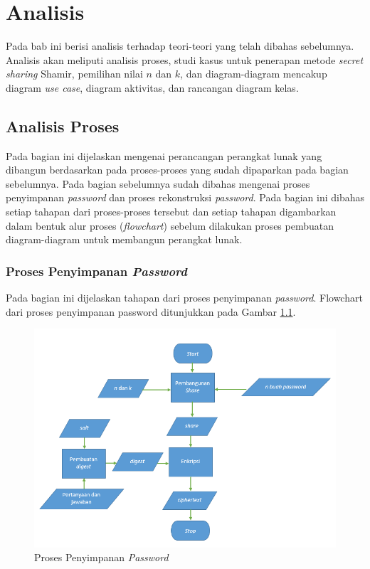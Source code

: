 \chapter{Analisis}
\label{chap:analisis}

Pada bab ini berisi analisis terhadap teori-teori yang telah dibahas sebelumnya. Analisis akan meliputi analisis proses, studi kasus untuk penerapan metode \textit{secret sharing} Shamir, pemilihan nilai \begin{math}n\end{math} dan \begin{math}k\end{math}, dan diagram-diagram mencakup diagram \textit{use case}, diagram aktivitas, dan rancangan diagram kelas.

\section{Analisis Proses}\label{sec:analisis}

Pada bagian ini dijelaskan mengenai perancangan perangkat lunak yang dibangun berdasarkan pada proses-proses yang sudah dipaparkan pada bagian sebelumnya. Pada bagian sebelumnya sudah dibahas mengenai proses penyimpanan \textit{password} dan proses rekonstruksi \textit{password}. Pada bagian ini dibahas setiap tahapan dari proses-proses tersebut dan setiap tahapan digambarkan dalam bentuk alur proses (\textit{flowchart}) sebelum dilakukan proses pembuatan diagram-diagram untuk membangun perangkat lunak.

\subsection{Proses Penyimpanan \textit{Password}}

Pada bagian ini dijelaskan tahapan dari proses penyimpanan \textit{password}. Flowchart dari proses penyimpanan password ditunjukkan pada Gambar \ref{fig:create_share}.

\begin{figure}[H]
	\centerline{\includegraphics[scale=0.7]{Gambar/flowchart_share}}
	\caption{Proses Penyimpanan \textit{Password}}\label{fig:create_share}
\end{figure}

